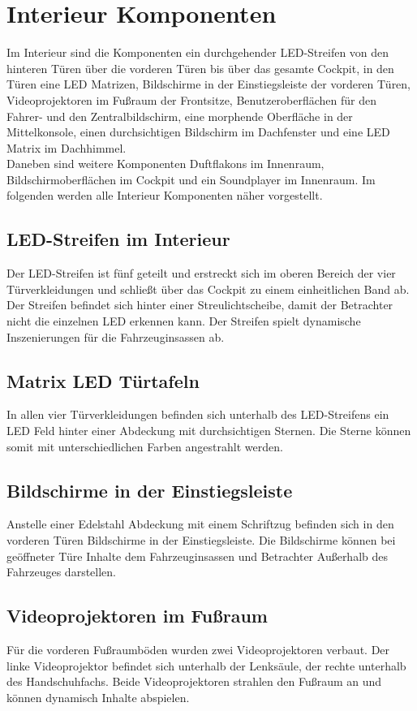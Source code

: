 \section{Interieur Komponenten}
Im Interieur sind die Komponenten ein durchgehender LED-Streifen von den hinteren Türen über die vorderen Türen bis über das gesamte Cockpit, in den Türen eine LED Matrizen, Bildschirme in der Einstiegsleiste der vorderen Türen, Videoprojektoren im Fußraum der Frontsitze, Benutzeroberflächen für den Fahrer- und den Zentralbildschirm, eine morphende Oberfläche in der Mittelkonsole, einen durchsichtigen Bildschirm im Dachfenster und eine LED Matrix im Dachhimmel.\\
Daneben sind weitere Komponenten Duftflakons im Innenraum, Bildschirmoberflächen im Cockpit und ein Soundplayer im Innenraum.
Im folgenden werden alle Interieur Komponenten näher vorgestellt.
\subsection{LED-Streifen im Interieur}
Der LED-Streifen ist fünf geteilt und erstreckt sich im oberen Bereich der vier Türverkleidungen und schließt über das Cockpit zu einem einheitlichen Band ab. Der Streifen befindet sich hinter einer Streulichtscheibe, damit der Betrachter nicht die einzelnen LED erkennen kann. 
Der Streifen spielt dynamische Inszenierungen für die Fahrzeuginsassen ab.
\subsection{Matrix LED Türtafeln}
In allen vier Türverkleidungen befinden sich unterhalb des LED-Streifens ein LED Feld hinter einer Abdeckung mit durchsichtigen Sternen. Die Sterne können somit mit unterschiedlichen Farben angestrahlt werden. 
\subsection{Bildschirme in der Einstiegsleiste}
Anstelle einer Edelstahl Abdeckung mit einem Schriftzug befinden sich in den vorderen Türen Bildschirme in der Einstiegsleiste. Die Bildschirme können bei geöffneter Türe Inhalte dem Fahrzeuginsassen und Betrachter Außerhalb des Fahrzeuges darstellen.
\subsection{Videoprojektoren im Fußraum}
Für die vorderen Fußraumböden wurden zwei Videoprojektoren verbaut. Der linke Videoprojektor befindet sich unterhalb der Lenksäule, der rechte unterhalb des Handschuhfachs. Beide Videoprojektoren strahlen den Fußraum an und können dynamisch Inhalte abspielen.
